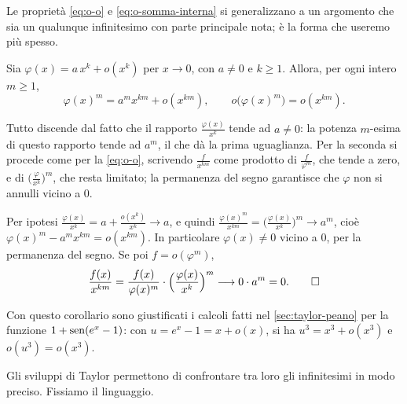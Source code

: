 Le proprietà \eqref{eq:o-o} e \eqref{eq:o-somma-interna} si generalizzano a un argomento che
sia un qualunque infinitesimo con parte principale nota; è la forma che useremo più
spesso.

\begin{corollario}\label{cor:o-composto}
Sia $\varphi(x)=a\,x^{k}+o(x^{k})$ per $x\to0$, con $a\neq0$ e $k\ge1$. Allora, per ogni intero
$m\ge1$,
\begin{equation}\label{eq:o-composto}
  \varphi(x)^{m}=a^{m}x^{km}+o(x^{km}), \qquad o\bigl(\varphi(x)^{m}\bigr)=o(x^{km}) .
\end{equation}
\end{corollario}

\begin{schema}
\end{schema}

\begin{strategia}
Tutto discende dal fatto che il rapporto $\frac{\varphi(x)}{x^{k}}$ tende ad $a\neq0$: la potenza
$m$-esima di questo rapporto tende ad $a^{m}$, il che dà la prima uguaglianza. Per la
seconda si procede come per la \eqref{eq:o-o}, scrivendo $\frac{f}{x^{km}}$ come prodotto di
$\frac{f}{\varphi^{m}}$, che tende a zero, e di $\bigl(\frac{\varphi}{x^{k}}\bigr)^{m}$, che resta limitato;
la permanenza del segno garantisce che $\varphi$ non si annulli vicino a $0$.
\end{strategia}

\begin{dimostrazione}
Per ipotesi $\frac{\varphi(x)}{x^{k}}=a+\frac{o(x^{k})}{x^{k}}\to a$, e quindi
$\frac{\varphi(x)^{m}}{x^{km}}=\bigl(\frac{\varphi(x)}{x^{k}}\bigr)^{m}\to a^{m}$, cioè
$\varphi(x)^{m}-a^{m}x^{km}=o(x^{km})$. In particolare $\varphi(x)\neq0$ vicino a $0$, per la permanenza
del segno. Se poi $f=o(\varphi^{m})$,
\[
  \frac{f(x)}{x^{km}}=\frac{f(x)}{\varphi(x)^{m}}\cdot\Bigl(\frac{\varphi(x)}{x^{k}}\Bigr)^{m}\longrightarrow0\cdot a^{m}=0 .
  \qedhere
\]
\end{dimostrazione}

Con questo corollario sono giustificati i calcoli fatti nel \cref{sec:taylor-peano} per la
funzione $1+\operatorname{sen}(e^{x}-1)$: con $u=e^{x}-1=x+o(x)$, si ha $u^{3}=x^{3}+o(x^{3})$ e
$o(u^{3})=o(x^{3})$.

Gli sviluppi di Taylor permettono di confrontare tra loro gli infinitesimi in modo
preciso. Fissiamo il linguaggio.

